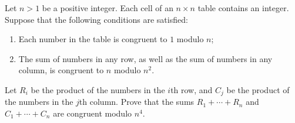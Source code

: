 Let $n>1$ be a positive integer. Each cell of an $n\times n$ table contains an integer. Suppose that the following conditions are satisfied:
\begin{enumerate}[label=(\roman*)]
	\item Each number in the table is congruent to $1$ modulo $n$;
	\item The sum of numbers in any row, as well as the sum of numbers in any column, is congruent to $n$ modulo $n^2$.
\end{enumerate}
Let $R_i$ be the product of the numbers in the $i$th row, and $C_j$ be the product of the numbers in the $j$th column. Prove that the sums $R_1+\cdots+R_n$ and $C_1+\cdots+C_n$ are congruent modulo $n^4$.